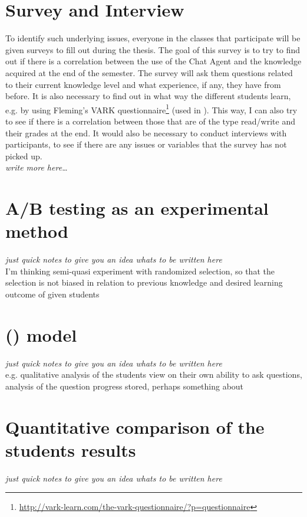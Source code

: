 \section{Survey and Interview}
\label{chapter4:survey_and_interview}
To identify such underlying issues, everyone in the classes that participate will be given surveys to fill out during the thesis. The goal of this survey is to try 
to find out if there is a correlation between the use of the Chat Agent and the knowledge acquired at the end of the semester. The survey will ask them questions 
related to their current knowledge level and what experience, if any, they have from before. It is also necessary to find out in what way the different students learn, 
e.g. by using Fleming's VARK questionnaire\footnote{\url{http://vark-learn.com/the-vark-questionnaire/?p=questionnaire}} (used in \cite[p.~152]{Kowalski2013}). This way, 
I can also try to see if there is a correlation between those that are of the type read/write and their grades at the end.
\vspace{0.5em}\newline
It would also be necessary to conduct interviews with participants, to see if there are any issues or variables that the survey has not picked up. \\
\emph{write more here\ldots}

\section{A/B testing as an experimental method}
\label{chapter4:ab_testing_experimental}
\emph{just quick notes to give you an idea whats to be written here} \\
I'm thinking semi-quasi experiment with randomized selection, so that the selection is not biased in relation to previous knowledge and desired learning outcome of 
given students

\section{ () model}
\label{chapter4:qa_model}
\emph{just quick notes to give you an idea whats to be written here} \\
e.g. qualitative analysis of the students view on their own ability to ask questions, analysis of the question progress stored, perhaps something about 

\section{Quantitative comparison of the students results}
\label{chapter4:quantitative_comparison}
\emph{just quick notes to give you an idea whats to be written here} \\


